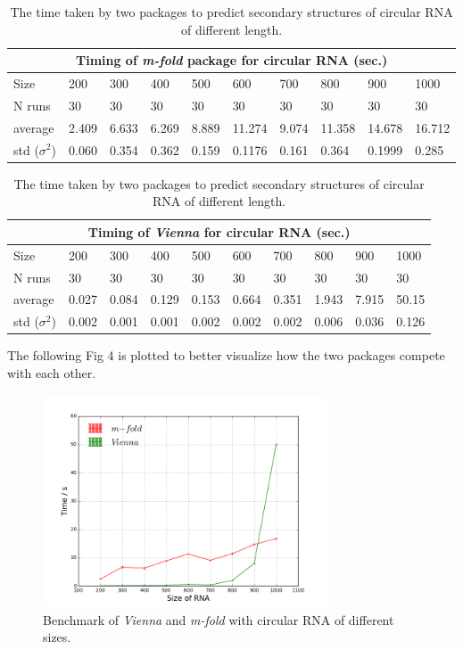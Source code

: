 \documentclass[12pt]{article}
\begin{document}
\begin{table}[h!]
    \begin{tabular}{ |p{1.5cm}||p{1.05cm}|p{1.05cm}|p{1.05cm}|p{1.05cm}|p{1.05cm}|p{1.05cm}|p{1.05cm}| p{1.05cm} | p{1.05cm} |}
    \hline
    \multicolumn{10}{|c|}{Timing of \textit{m-fold} package for circular RNA (sec.)} \\
    \hline
    Size& 200& 300& 400& 500& 600& 700 & 800 & 900 & 1000\\
    \hline
    N runs& 30 & 30& 30 & 30& 30& 30& 30& 30& 30\\
    \hline
    average& 2.409 & 6.633 & 6.269 & 8.889 & 11.274 & 9.074 & 11.358 & 14.678 &16.712\\
    std ($\sigma^2$) & 0.060 & 0.354 & 0.362 & 0.159 & 0.1176 & 0.161 & 0.364 & 0.1999 & 0.285 \\
    \hline
    \end{tabular}
    \begin{tabular}{ |p{1.5cm}||p{1.05cm}|p{1.05cm}|p{1.05cm}|p{1.05cm}|p{1.05cm}|p{1.05cm}|p{1.05cm}| p{1.05cm} | p{1.05cm} |}
    \hline
    \multicolumn{10}{|c|}{Timing of \textit{Vienna} for circular RNA (sec.)} \\
    \hline
    Size& 200& 300& 400& 500& 600& 700 & 800 & 900 & 1000\\
    \hline
    N runs& 30 & 30& 30 & 30& 30& 30& 30& 30& 30\\
    \hline
    average& 0.027 & 0.084 & 0.129 & 0.153 & 0.664 & 0.351 & 1.943 & 7.915 & 50.15\\
    std ($\sigma^2$) & 0.002 & 0.001 & 0.001 & 0.002 & 0.002 & 0.002 & 0.006 & 0.036 & 0.126 \\
    \hline
    \end{tabular}
\caption{The time taken by two packages to predict secondary structures of circular RNA of different length.}
\end{table}

The following Fig 4 is plotted to better visualize how the two packages compete with each other.
\begin{figure}[htbp!]
    \centering
    \includegraphics[width=0.75\textwidth]{c-m-v.png}
    \caption{Benchmark of \textit{Vienna} and \textit{m-fold} with circular RNA of different sizes.}
\end{figure}
\end{document}
